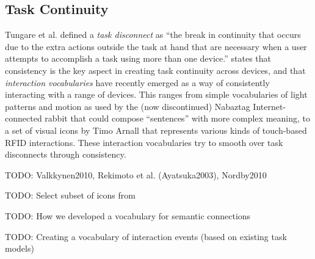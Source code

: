 \subsection{Task Continuity}

Tungare et al. \cite{Tungare2007} defined a \emph{task disconnect} as ``the break in continuity that occurs due to the extra actions outside the task at hand that are necessary when a user attempts to accomplish a task using more than one device.'' \cite{Kuniavsky} states that consistency is the key aspect in creating task continuity across devices, and that \emph{interaction vocabularies} have recently emerged as a way of consistently interacting with a range of devices. This ranges from simple vocabularies of light patterns and motion as used by the (now discontinued) Nabaztag Internet-connected rabbit that could compose ``sentences'' with more complex meaning, to a set of visual icons by Timo Arnall \cite{Arnall2006} that represents various kinds of touch-based RFID interactions.
These interaction vocabularies try to smooth over task disconnects through consistency.

TODO: Valkkynen2010,  Rekimoto et al. (Ayatsuka2003), Nordby2010

TODO: Select subset of icons from %

TODO: How we developed a vocabulary for semantic connections

TODO: Creating a vocabulary of interaction events (based on existing task models)
